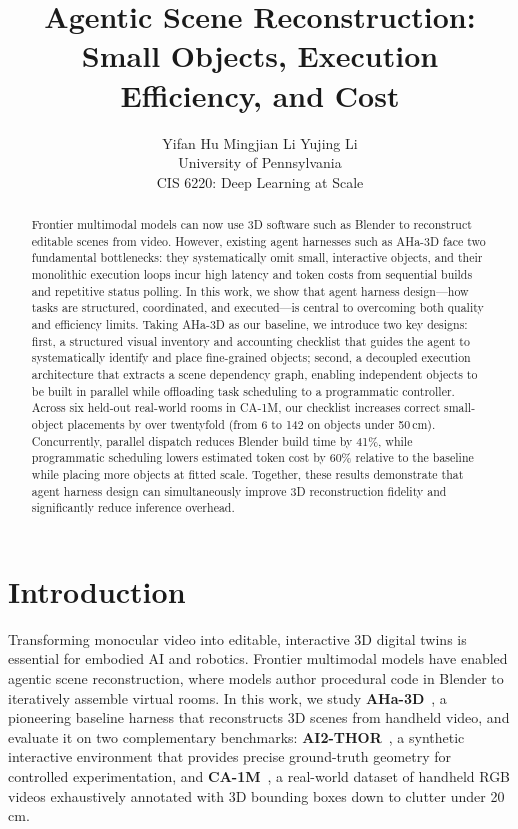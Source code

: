 \documentclass{article}
\title{Agentic Scene Reconstruction:\\Small Objects, Execution Efficiency, and Cost}
\author{Yifan Hu \qquad Mingjian Li \qquad Yujing Li\\University of Pennsylvania\\CIS 6220: Deep Learning at Scale}
\begin{document}
\maketitle
\begin{abstract}
Frontier multimodal models can now use 3D software such as Blender to reconstruct editable scenes from video. However, existing agent harnesses such as AHa-3D face two fundamental bottlenecks: they systematically omit small, interactive objects, and their monolithic execution loops incur high latency and token costs from sequential builds and repetitive status polling. In this work, we show that agent harness design---how tasks are structured, coordinated, and executed---is central to overcoming both quality and efficiency limits. Taking AHa-3D as our baseline, we introduce two key designs: first, a structured visual inventory and accounting checklist that guides the agent to systematically identify and place fine-grained objects; second, a decoupled execution architecture that extracts a scene dependency graph, enabling independent objects to be built in parallel while offloading task scheduling to a programmatic controller. Across six held-out real-world rooms in CA-1M, our checklist increases correct small-object placements by over twentyfold (from 6 to 142 on objects under 50\,cm). Concurrently, parallel dispatch reduces Blender build time by 41\%, while programmatic scheduling lowers estimated token cost by 60\% relative to the baseline while placing more objects at fitted scale. Together, these results demonstrate that agent harness design can simultaneously improve 3D reconstruction fidelity and significantly reduce inference overhead.
\end{abstract}

\section{Introduction}
Transforming monocular video into editable, interactive 3D digital twins is essential for embodied AI and robotics. Frontier multimodal models have enabled agentic scene reconstruction, where models author procedural code in Blender to iteratively assemble virtual rooms. In this work, we study \textbf{AHa-3D}~\cite{aha3d}, a pioneering baseline harness that reconstructs 3D scenes from handheld video, and evaluate it on two complementary benchmarks: \textbf{AI2-THOR}~\cite{ai2thor}, a synthetic interactive environment that provides precise ground-truth geometry for controlled experimentation, and \textbf{CA-1M}~\cite{ca1m}, a real-world dataset of handheld RGB videos exhaustively annotated with 3D bounding boxes down to clutter under 20\,cm.
\end{document}
